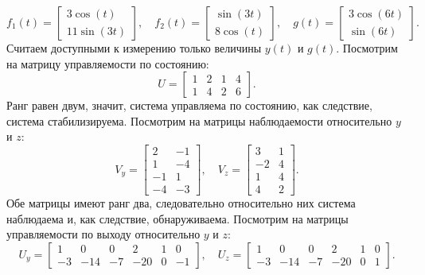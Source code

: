 \begin{equation*}
    f_1(t)=\begin{bmatrix}
        3\cos(t)\\11\sin(3t)
    \end{bmatrix},\quad
    f_2(t)=\begin{bmatrix}
        \sin(3t)\\8\cos(t)
    \end{bmatrix},\quad
    g(t)=\begin{bmatrix}
        3\cos(6t)\\\sin(6t)
    \end{bmatrix}.
\end{equation*}
Считаем доступными к измерению только величины $y(t)$ и $g(t)$.
Посмотрим на матрицу управляемости по состоянию:
\begin{equation*}
    U=\begin{bmatrix}
        1 & 2 & 1 & 4 \\
        1 & 4 & 2 & 6
    \end{bmatrix}.
\end{equation*}
Ранг равен двум, значит, система управляема по состоянию, как следствие, 
система стабилизируема.
Посмотрим на матрицы наблюдаемости относительно $y$ и $z$:
\begin{equation*}
    V_y=\begin{bmatrix}
        2 & -1 \\
        1 & -4 \\
        -1 & 1 \\
        -4 & -3
    \end{bmatrix},\quad
    V_z=\begin{bmatrix}
        3&	1\\
        -2&	4\\
        1	&4\\
        4	&2
    \end{bmatrix}.
\end{equation*}
Обе матрицы имеют ранг два, следовательно относительно них система наблюдаема и,
как следствие, обнаруживаема.
Посмотрим на матрицы управляемости по выходу относительно $y$ и $z$:
\begin{equation*}
    U_y=\begin{bmatrix}
        1&	0&	0	&2&	1&0\\
        -3	&-14	&-7&	-20&	0&	-1
    \end{bmatrix},\quad
    U_z=\begin{bmatrix}
        1&	0&	0	&2&	1&0\\
        -3	&-14	&-7&	-20&	0&	1
    \end{bmatrix}.
\end{equation*}
